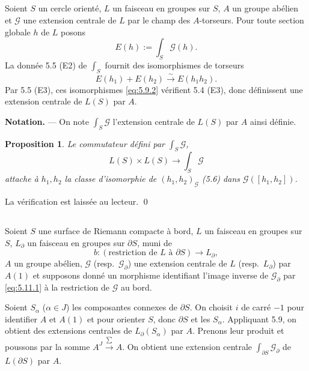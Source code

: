 \documentclass[12pt,a4paper]{article}
\theoremstyle{plain}
\newtheorem{proposition}[theorem]{Proposition}
\theoremstyle{definition}
\theoremstyle{remark}
\begin{document}
\subsection{}

Soient $S$ un cercle orienté, $L$ un faisceau en groupes sur $S$, $A$ un groupe abélien
et $\mathscr{G}$ une extension centrale de $L$ par le champ des $A$-torseurs. Pour toute section globale $h$
de $L$ posons
\begin{equation}\label{eq:5.9.1}
E(h) := \int_S \mathscr{G}(h).
\end{equation}
La donnée 5.5 (E2) de $\int_S$ fournit des isomorphismes de torseurs
\begin{equation}\label{eq:5.9.2}
E(h_1) + E(h_2) \xrightarrow{\sim} E(h_1 h_2).
\end{equation}
Par 5.5 (E3), ces isomorphismes \eqref{eq:5.9.2} vérifient 5.4 (E3), donc définissent une extension centrale de $L(S)$ par $A$.

\textbf{Notation.} --- On note $\int_S \mathscr{G}$ l'extension centrale de $L(S)$ par $A$ ainsi définie.

\begin{proposition}
Le commutateur défini par $\int_S \mathscr{G}$,
\[
L(S) \times L(S) \to \int_S \mathscr{G}
\]
attache à $h_1, h_2$ la classe d'isomorphie de $(h_1, h_2)_\mathscr{G}$ \emph{(5.6)} dans $\mathscr{G}([h_1, h_2])$.
\end{proposition}

La vérification est laissée au lecteur.
\qed

\subsection{}

Soient $S$ une surface de Riemann compacte à bord, $L$ un faisceau en groupes
sur $S$, $L_\partial$ un faisceau en groupes sur $\partial S$, muni de
\begin{equation}\label{eq:5.11.1}
b : (\text{restriction de } L \text{ à } \partial S) \to L_\partial,
\end{equation}
$A$ un groupe abélien, $\mathscr{G}$ (resp.~$\mathscr{G}_\partial$) une extension centrale de $L$ (resp.~$L_\partial$) par $A(1)$ et
supposons donné un morphisme identifiant l'image inverse de $\mathscr{G}_\partial$ par \eqref{eq:5.11.1} à la
restriction de $\mathscr{G}$ au bord.

Soient $S_\alpha$ ($\alpha \in J$) les composantes connexes de $\partial S$. On choisit $i$ de carré $-1$ pour
identifier $A$ et $A(1)$ et pour orienter $S$, donc $\partial S$ et les $S_\alpha$. Appliquant 5.9, on obtient
des extensions centrales de $L_\partial(S_\alpha)$ par $A$. Prenons leur produit et poussons par la somme
$A^J \xrightarrow{\sum} A$. On obtient une extension centrale $\int_{\partial S} \mathscr{G}_\partial$ de $L(\partial S)$ par $A$.
\end{document}
